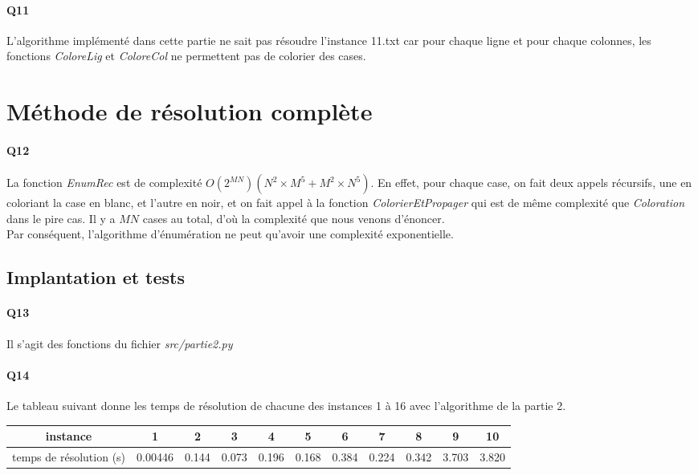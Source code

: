 \documentclass[12pt]{article}
\begin{document}
			\paragraph{Q11}
				L'algorithme implémenté dans cette partie ne sait pas résoudre l'instance 11.txt car pour chaque ligne et pour chaque colonnes, les fonctions \textit{ColoreLig} et \textit{ColoreCol} ne permettent pas de colorier des cases.
	
	
	\section{Méthode de résolution complète}
		
		\paragraph{Q12}
		
			La fonction \textit{EnumRec} est de complexité $ \boxed{O(2^{MN}) (N^2 \times M^5 + M^2 \times N^5) } $. En effet, pour chaque case, on fait deux appels récursifs, une en coloriant la case en blanc, et l'autre en noir, et on fait appel à la fonction \textit{ColorierEtPropager} qui est de même complexité que \textit{Coloration} dans le pire cas. Il y a $ MN $ cases au total, d'où la complexité que nous venons d'énoncer. \\
			Par conséquent, l'algorithme d'énumération ne peut qu'avoir une complexité exponentielle.
		
		\subsection{Implantation et tests}
		
			\paragraph{Q13}
				Il s'agit des fonctions du fichier \textit{src/partie2.py}
		
			\paragraph{Q14}
				Le tableau suivant donne les temps de résolution de chacune des instances 1 à 16 avec l'algorithme de la partie 2.
				\begin{center}
					\begin{tabular}{|c|c|c|c|c|c|c|c|c|c|c| }
						\hline
						instance & 1 & 2 & 3 & 4 & 5 & 6 & 7 & 8 & 9 & 10 \\ \hline
						temps de résolution (s) & 0.00446 & 0.144 & 0.073 & 0.196 & 0.168 & 0.384 & 0.224 & 0.342 & 3.703 & 3.820 \\ \hline
					\end{tabular}
				\end{center}
			
\end{document}
